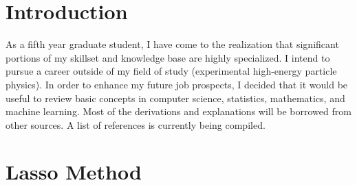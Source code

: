 \documentclass[
10pt, %
a4paper, %
oneside, %
headinclude,footinclude, %
BCOR5mm, %
]{scrartcl}
\begin{document}
{\let\thefootnote\relax{}}


\newpage %


\section{Introduction}

As a fifth year graduate student, I have come to the realization that significant portions of my skillset and knowledge base are highly specialized. I intend to pursue a career outside of my field of study (experimental high-energy particle physics). In order to enhance my future job prospects, I decided that it would be useful to review basic concepts in computer science, statistics, mathematics, and machine learning. Most of the derivations and explanations will be borrowed from other sources. A list of references is currently being compiled. 








\section{Lasso Method}

\end{document}
